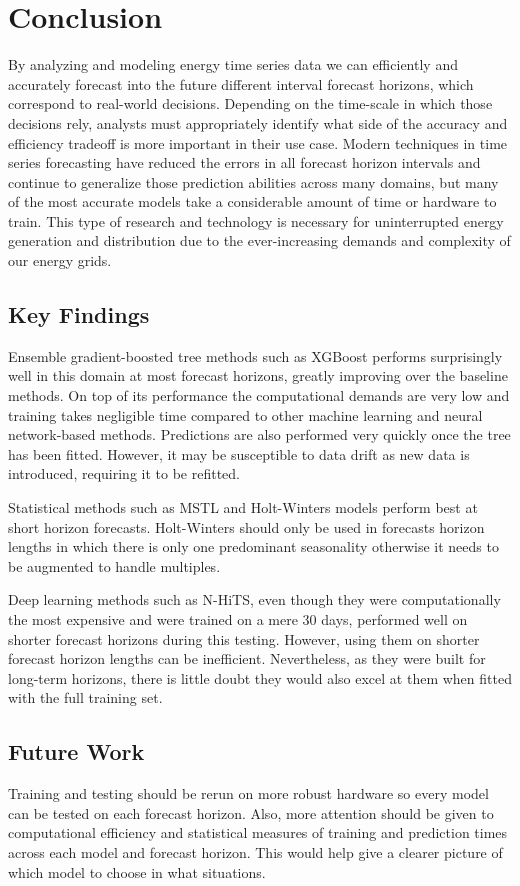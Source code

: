 \documentclass[sigconf]{acmart}
\begin{document}
\section{Conclusion}
By analyzing and modeling energy time series data we can efficiently and accurately forecast into the future different interval forecast horizons, which correspond to real-world decisions. Depending on the time-scale in which those decisions rely, analysts must appropriately identify what side of the accuracy and efficiency tradeoff is more important in their use case. Modern techniques in time series forecasting have reduced the errors in all forecast horizon intervals and continue to generalize those prediction abilities across many domains, but many of the most accurate models take a considerable amount of time or hardware to train. This type of research and technology is necessary for uninterrupted energy generation and distribution due to the ever-increasing demands and complexity of our energy grids.

\subsection{Key Findings}
Ensemble gradient-boosted tree methods such as XGBoost performs surprisingly well in this domain at most forecast horizons, greatly improving over the baseline methods. On top of its performance the computational demands are very low and training takes negligible time compared to other machine learning and neural network-based methods. Predictions are also performed very quickly once the tree has been fitted. However, it may be susceptible to data drift as new data is introduced, requiring it to be refitted.

Statistical methods such as MSTL and Holt-Winters models perform best at short horizon forecasts. Holt-Winters should only be used in forecasts horizon lengths in which there is only one predominant seasonality otherwise it needs to be augmented to handle multiples.

Deep learning methods such as N-HiTS, even though they were computationally the most expensive and were trained on a mere 30 days, performed well on shorter forecast horizons during this testing. However, using them on shorter forecast horizon lengths can be inefficient. Nevertheless, as they were built for long-term horizons, there is little doubt they would also excel at them when fitted with the full training set.

\subsection{Future Work}
Training and testing should be rerun on more robust hardware so every model can be tested on each forecast horizon. Also, more attention should be given to computational efficiency and statistical measures of training and prediction times across each model and forecast horizon. This would help give a clearer picture of which model to choose in what situations.
\end{document}
